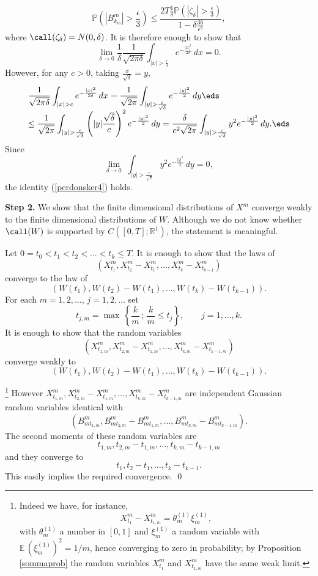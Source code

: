 \documentclass[preprint]{imsart}
\def\P{\mathbb P}
\def\E{\mathbb E}
\def\R{\mathbb R}
\def\ds{\displaystyle}
\begin{document}
{$$\P\left(|B_{k_m}^m|>\frac{\epsilon}{3}\right)
\leq
\frac{
2T\frac{1}{\delta}
\P\left(|\zeta_\delta |>\frac{\epsilon}{3}\right)
}
 { 1-\delta \frac{36}{\epsilon^2}}
 ,
$$
where $\call(\zeta_\delta)=N(0,\delta)$. It is
therefore enough to show that
\begin{equation}\label{perdonsker4}
\lim_{\delta\to 0} \frac{1}{\delta}\frac{1}
{\sqrt{2\pi\delta}}\int_{|x|>\frac{\epsilon}{3}}
e^{-\frac{|x|^2}{2\delta}}\, dx =0.
\end{equation}
However, for any $c>0$, taking
$\frac{x}{\sqrt{\delta}}=y$,
$$\begin{array}{l}\ds
\frac{1}{\sqrt{2\pi\delta}}
\int_{|x|>c}
e^{-\frac{|x|^2}{2\delta}}\, dx =
\frac{1}{\sqrt{2\pi }}
\int_{|y|>\frac{c}{\sqrt{\delta}}}
e^{-\frac{|y|^2}{2}}\, dy
\eds\\\ds
\leq
\frac{1}{\sqrt{2\pi }}
\int_{|y|>\frac{c}{\sqrt{\delta}}}
\left( |y|\frac{\sqrt{\delta}}{c}\right)^2
e^{-\frac{|y|^2}{2}}\, dy =
\frac{\delta}{c^2\sqrt{2\pi }}
\int_{|y|>\frac{c}{\sqrt{\delta}}}
 y^2
e^{-\frac{|y|^2}{2}}\, dy.
\eds\end{array}
$$
Since
$$
\lim_{\delta\to 0} \; \int_{|y|>\frac{c}{\sqrt{\delta}}}
 y^2
e^{-\frac{|y|^2}{2}}\, dy =0,
$$
the identity (\ref{perdonsker4}) holds.


{\bf Step 2.} We show that the finite dimensional
distributions of $X^m$ converge weakly to the finite
dimensional distributions of $W$. Although we do not
know whether $\call(W)$ is supported by
$C([0,T];\R^1)$, the statement is meaningful.

Let $0=t_0<t_1<t_2<\ldots<t_k\leq T$. It is enough to
show that the laws of
$$
\left(X^m_{t_1}, X^m_{t_2}-X^m_{t_1},\ldots ,
X^m_{t_k}-X^m_{t_{k-1}}\right)
$$
converge to the law of
$$
\left(W(t_1), W(t_2)-W(t_1),\ldots ,
W(t_k)-W(t_{k-1})\right) .
$$
For each $m=1,2,\ldots$, $j=1,2,\ldots$ set
$$
t_{j,m}=\max \, \left\{
\frac{k}{m}\, ; \, \frac{k}{m}\leq t_j\right\},
\qquad j=1,\ldots ,k.
$$
It is enough to show that the random variables
$$
\left(X^m_{t_{1,m}}, X^m_{t_{2,m}}-X^m_{t_{1,m}},\ldots ,
X^m_{t_{k,m}}-X^m_{t_{k-1,m}}\right)
$$
converge weakly to
$$
\left(W(t_1), W(t_2)-W(t_1),\ldots ,
W(t_k)-W(t_{k-1})\right) .
$$

\footnote{
Indeed we have, for instance,
$$
X^m_{t_1}-X^m_{t_{1,m}}=\theta_m^{(1)}\xi_m^{(1)},
$$
with $\theta_m^{(1)} $ a number in $[0,1]$ and
$\xi_m^{(1)} $ a random variable with $\E\,
(\xi_m^{(1)})^2=1/m$, hence converging to zero in
probability; by Proposition \ref{sommaprob} the random
variables $X^m_{t_1}$ and $X^m_{t_{1,m}}$ have the same
weak limit.
}
 However $X^m_{t_{1,m}},
X^m_{t_{2,m}}-X^m_{t_{1,m}},\ldots ,
X^m_{t_{k,m}}-X^m_{t_{k-1,m}}$ are independent Gaussian
random variables identical with
$$
\left(B^m_{mt_{1,m}}, B^m_{mt_{2,m}}-B^m_{mt_{1,m}},\ldots ,
B^m_{mt_{k,m}}-B^m_{mt_{k-1,m}}\right).
$$
The second moments of these random variables are
$$
 t_{1,m}, t_{2,m} - t_{1,m},\ldots ,
 t_{k,m} - t_{k-1,m}
$$
and they converge to
$$
 t_{1}, t_{2} - t_{1},\ldots ,
 t_{k} - t_{k-1}.
$$
This easily implies the required convergence. \qed



}
\end{document}
